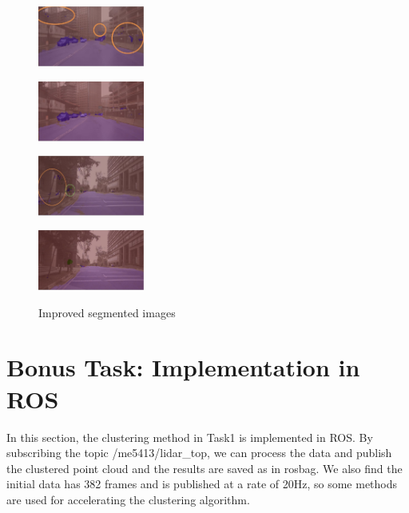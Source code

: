 \documentclass[10pt]{article}
\theoremstyle{nonumberplain}
\begin{document}
\begin{figure}[H]
	\centering
	\begin{minipage}[t]{0.24\textwidth}
		\centering
		\includegraphics[width=3.5cm]{fig7a.png}
		\label{fig7a}
	\end{minipage}
	\begin{minipage}[t]{0.24\textwidth}
		\centering
		\includegraphics[width=3.5cm]{fig7b.png}
		\label{fig7b}
	\end{minipage}
	\begin{minipage}[t]{0.24\textwidth}
		\centering
		\includegraphics[width=3.5cm]{fig7c.png}
		\label{fig7c}
	\end{minipage}
	\begin{minipage}[t]{0.24\textwidth}
		\centering
		\includegraphics[width=3.5cm]{fig7d.png}
		\label{fig7d}
	\end{minipage}
	\caption{Improved segmented images}
	\label{fig7}
\end{figure}



\section{Bonus Task: Implementation in ROS}

\hspace{1.0em}
In this section, the clustering method in Task1 is implemented in ROS. By subscribing the topic /me5413/lidar\_top, we can process the data and publish the clustered point cloud and the results are saved as in rosbag. We also find the initial data has 382 frames and is published at a rate of 20Hz, so some methods are used for accelerating the clustering algorithm.
\end{document}
